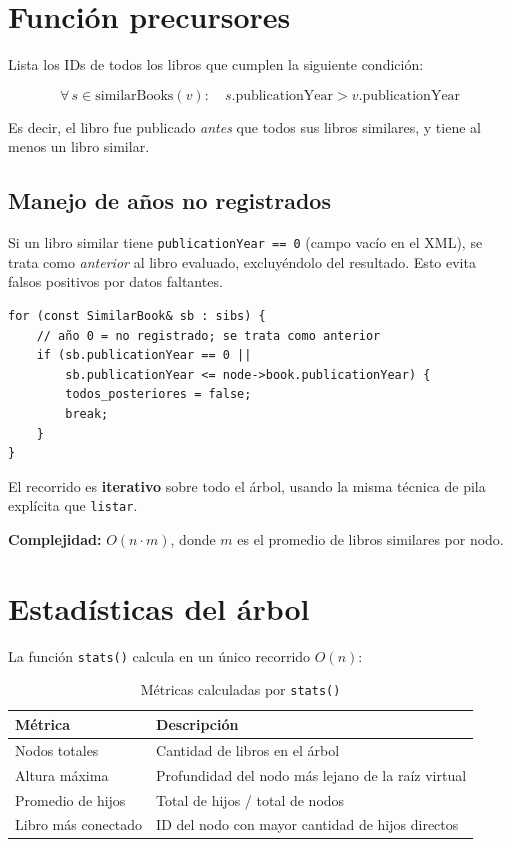 \documentclass[12pt, a4paper]{article}
\begin{document}
\section{Función precursores}

Lista los IDs de todos los libros que cumplen la siguiente condición:

\[
\forall\, s \in \text{similarBooks}(v): \quad s.\text{publicationYear} > v.\text{publicationYear}
\]

Es decir, el libro fue publicado \textit{antes} que todos sus libros similares,
y tiene al menos un libro similar.

\subsection{Manejo de años no registrados}

Si un libro similar tiene \texttt{publicationYear == 0} (campo vacío en el XML),
se trata como \textit{anterior} al libro evaluado, excluyéndolo del resultado.
Esto evita falsos positivos por datos faltantes.

\begin{lstlisting}
for (const SimilarBook& sb : sibs) {
    // año 0 = no registrado; se trata como anterior
    if (sb.publicationYear == 0 ||
        sb.publicationYear <= node->book.publicationYear) {
        todos_posteriores = false;
        break;
    }
}
\end{lstlisting}

El recorrido es \textbf{iterativo} sobre todo el árbol, usando la misma técnica de
pila explícita que \texttt{listar}.

\textbf{Complejidad:} $O(n \cdot m)$, donde $m$ es el promedio de libros similares
por nodo.

\section{Estadísticas del árbol}

La función \texttt{stats()} calcula en un único recorrido $O(n)$:

\begin{table}[h]
\centering
\begin{tabular}{@{}ll@{}}
\toprule
\textbf{Métrica} & \textbf{Descripción} \\
\midrule
Nodos totales & Cantidad de libros en el árbol \\
Altura máxima & Profundidad del nodo más lejano de la raíz virtual \\
Promedio de hijos & Total de hijos / total de nodos \\
Libro más conectado & ID del nodo con mayor cantidad de hijos directos \\
\bottomrule
\end{tabular}
\caption{Métricas calculadas por \texttt{stats()}}
\end{table}
\end{document}
